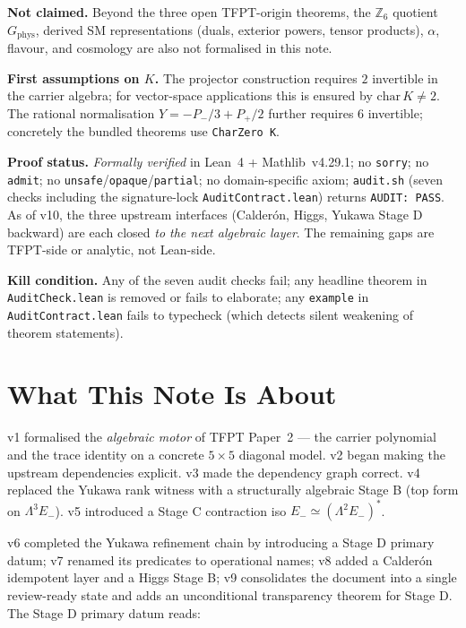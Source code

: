 \documentclass[11pt,a4paper]{article}
\begin{document}
\begin{tfptclaimcontract}
\textbf{Not claimed.}
Beyond the three open TFPT-origin theorems, the
$\mathbb Z_6$ quotient $G_{\mathrm{phys}}$, derived SM
representations (duals, exterior powers, tensor products),
$\alpha$, flavour, and cosmology are also not formalised
in this note.

\textbf{First assumptions on $K$.}
The projector construction requires $2$ invertible in the
carrier algebra; for vector-space applications this is ensured
by $\mathrm{char}\,K \ne 2$. The rational normalisation
$Y = -P_-/3 + P_+/2$ further requires $6$ invertible; concretely
the bundled theorems use \texttt{CharZero K}.

\textbf{Proof status.}
\emph{Formally verified} in Lean~4 + Mathlib~v4.29.1; no
\texttt{sorry}; no \texttt{admit}; no
\texttt{unsafe}/\texttt{opaque}/\texttt{partial}; no
domain-specific axiom; \texttt{audit.sh} (seven checks
including the signature-lock \texttt{AuditContract.lean})
returns \texttt{AUDIT:\ PASS}. As of v10, the three upstream
interfaces (Calder\'on, Higgs, Yukawa Stage D backward) are
each closed \emph{to the next algebraic layer}. The remaining
gaps are TFPT-side or analytic, not Lean-side.

\textbf{Kill condition.}
Any of the seven audit checks fail; any headline theorem in
\texttt{AuditCheck.lean} is removed or fails to elaborate;
any \texttt{example} in \texttt{AuditContract.lean} fails to
typecheck (which detects silent weakening of theorem statements).
\end{tfptclaimcontract}

\tableofcontents

\section{What This Note Is About}

v1 formalised the \emph{algebraic motor} of TFPT Paper~2 ---
the carrier polynomial and the trace identity on a concrete
$5\times5$ diagonal model. v2 began making the upstream
dependencies explicit. v3 made the dependency graph correct.
v4 replaced the Yukawa rank witness with a structurally
algebraic Stage B (top form on $\Lambda^3 E_-$). v5 introduced
a Stage C contraction iso $E_- \simeq (\Lambda^2 E_-)^*$.

v6 completed the Yukawa refinement chain by introducing a
Stage D primary datum; v7 renamed its predicates to operational
names; v8 added a Calder\'on idempotent layer and a Higgs Stage B;
v9 consolidates the document into a single review-ready state
and adds an unconditional transparency theorem for Stage D.
The Stage D primary datum reads:
\end{document}
